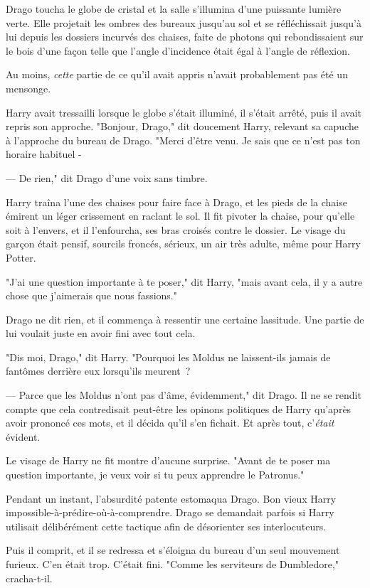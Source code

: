 Drago toucha le globe de cristal et la salle s'illumina d'une puissante lumière verte. Elle projetait les ombres des bureaux jusqu'au sol et se réfléchissait jusqu'à lui depuis les dossiers incurvés des chaises, faite de photons qui rebondissaient sur le bois d'une façon telle que l'angle d'incidence était égal à l'angle de réflexion.

Au moins, \emph{cette} partie de ce qu'il avait appris n'avait probablement pas été un mensonge.

Harry avait tressailli lorsque le globe s'était illuminé, il s'était arrêté, puis il avait repris son approche. "Bonjour, Drago," dit doucement Harry, relevant sa capuche à l'approche du bureau de Drago. "Merci d'être venu. Je sais que ce n'est pas ton horaire habituel -

--- De rien," dit Drago d'une voix sans timbre.

Harry traîna l'une des chaises pour faire face à Drago, et les pieds de la chaise émirent un léger crissement en raclant le sol. Il fit pivoter la chaise, pour qu'elle soit à l'envers, et il l'enfourcha, ses bras croisés contre le dossier. Le visage du garçon était pensif, sourcils froncés, sérieux, un air très adulte, même pour Harry Potter.

"J'ai une question importante à te poser," dit Harry, "mais avant cela, il y a autre chose que j'aimerais que nous fassions."

Drago ne dit rien, et il commença à ressentir une certaine lassitude. Une partie de lui voulait juste en avoir fini avec tout cela.

"Dis moi, Drago," dit Harry. "Pourquoi les Moldus ne laissent-ils jamais de fantômes derrière eux lorsqu'ils meurent~?

--- Parce que les Moldus n'ont pas d'âme, évidemment," dit Drago. Il ne se rendit compte que cela contredisait peut-être les opinons politiques de Harry qu'après avoir prononcé ces mots, et il décida qu'il s'en fichait. Et après tout, c'\emph{était} évident.

Le visage de Harry ne fit montre d'aucune surprise. "Avant de te poser ma question importante, je veux voir si tu peux apprendre le Patronus."

Pendant un instant, l'absurdité patente estomaqua Drago. Bon vieux Harry impossible-à-prédire-où-à-comprendre. Drago se demandait parfois si Harry utilisait délibérément cette tactique afin de désorienter ses interlocuteurs.

Puis il comprit, et il se redressa et s'éloigna du bureau d'un seul mouvement furieux. C'en était trop. C'était fini. "Comme les serviteurs de Dumbledore," cracha-t-il.

